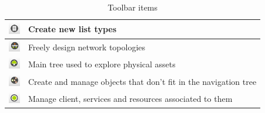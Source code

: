 \documentclass[a4paper]{article}
\begin{document}
\begin{table}[h!]
\begin{tabular}{cl}
			\midrule
			\includegraphics[width=0.5cm]{img/icon_list_type_manager.png} & Create new list types\\
			\midrule
			\includegraphics[width=0.5cm]{img/icon_topology_designer.png} & Freely design network topologies\\
			\midrule
			\includegraphics[width=0.5cm]{img/icon_navigation_tree.png} & Main tree used to explore physical assets\\
			\midrule
			\includegraphics[width=0.5cm]{img/icon_pools_manager.png} & Create and manage objects that don't fit in the navigation tree\\
			\midrule
			\includegraphics[width=0.5cm]{img/icon_service_manager.png} & Manage client, services and resources associated to them\\
		\end{tabular}	
		\caption{Toolbar items}
		\label{tab:toolbar_icons}
	\end{table}
	
	\newpage
\end{document}
